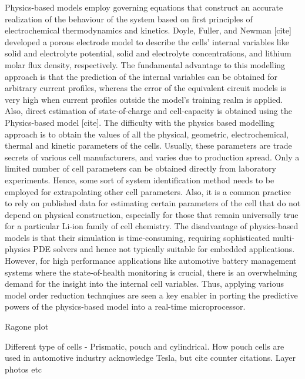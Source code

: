 Physics-based  models  employ governing  equations  that  construct an  accurate
realization  of  the   behaviour  of  the  system  based   on  first  principles
of   electrochemical   thermodynamics   and   kinetics.   Doyle,   Fuller,   and
Newman  {[}cite{]}   developed  a  porous   electrode  model  to   describe  the
cells\textquoteright{} internal variables like  solid and electrolyte potential,
solid  and   electrolyte  concentrations,   and  lithium  molar   flux  density,
respectively. The fundamental  advantage to this modelling approach  is that the
prediction  of the  internal variables  can  be obtained  for arbitrary  current
profiles, whereas the  error of the equivalent circuit models  is very high when
current profiles outside  the model\textquoteright s training  realm is applied.
Also, direct estimation  of state-of-charge and cell-capacity  is obtained using
the  Physics-based  model {[}cite{]}.  The  difficulty  with the  physics  based
modelling  approach is  to obtain  the values  of all  the physical,  geometric,
electrochemical, thermal  and kinetic  parameters of  the cells.  Usually, these
parameters are  trade secrets of various  cell manufacturers, and varies  due to
production spread.  Only a  limited number  of cell  parameters can  be obtained
directly from laboratory experiments. Hence,  some sort of system identification
method needs to be employed for extrapolating other cell parameters. Also, it is
a common practice to rely on published data for estimating certain parameters of
the cell that do not depend  on physical construction, especially for those that
remain universally  true for a particular  Li-ion family of cell  chemistry. The
disadvantage of physics-based models is that their simulation is time-consuming,
requiring  sophisticated  multi-physics  PDE  solvers and  hence  not  typically
suitable for  embedded applications. However, for  high performance applications
like automotive battery management  systems where the state-of-health monitoring
is crucial,  there is an overwhelming  demand for the insight  into the internal
cell variables. Thus, applying various model order reduction technqiues are seen
a key enabler in porting the predictive powers of the physics-based model into a
real-time microprocessor.


Ragone plot

Different type of cells - Prismatic,  pouch and cylindrical. How pouch cells are
used in automotive industry acknowledge Tesla, but cite counter citations. Layer
photos etc

